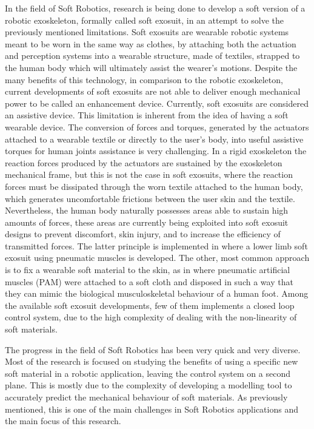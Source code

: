 In the field of Soft Robotics, research is being done to develop a soft version of a robotic exoskeleton, formally called soft exosuit, in an attempt to solve the previously mentioned limitations. Soft exosuits are wearable robotic systems meant to be worn in the same way as clothes, by attaching both the actuation and perception systems into a wearable structure, made of textiles, strapped to the human body which will ultimately assist the wearer's motions. Despite the many benefits of this technology, in comparison to the robotic exoskeleton, current developments of soft exosuits are not able to deliver enough mechanical power to be called an enhancement device. Currently, soft exosuits are considered an assistive device. This limitation is inherent from the idea of having a soft wearable device. The conversion of forces and torques, generated by the actuators attached to a wearable textile or directly to the user's body, into useful assistive torques for human joints assistance is very challenging. In a rigid exoskeleton the reaction forces produced by the actuators are sustained by the exoskeleton mechanical frame, but this is not the case in soft exosuits, where the reaction forces must be dissipated through the worn textile attached to the human body, which generates uncomfortable frictions between the user skin and the textile. Nevertheless, the human body naturally possesses areas able to sustain high amounts of forces, these areas are currently being exploited into soft exosuit designs to prevent discomfort, skin injury, and to increase the efficiency of transmitted forces. The latter principle is implemented in \cite{wehner2013lightweight} where a lower limb soft exosuit using pneumatic muscles is developed. The other, most common approach is to fix a wearable soft material to the skin, as in \cite{park2014design,park2011bio} where pneumatic artificial muscles (PAM) were attached to a soft cloth and disposed in such a way that they can mimic the biological musculoskeletal behaviour of a human foot. Among the available soft exosuit developments, few of them implements a closed loop control system, due to the high complexity of dealing with the non-linearity of soft materials. 

The progress in the field of Soft Robotics has been very quick and very diverse. Most of the research is focused on studying the benefits of using a specific new soft material in a robotic application, leaving the control system on a second plane. This is mostly due to the complexity of developing a modelling tool to accurately predict the mechanical behaviour of soft materials. As previously mentioned, this is one of the main challenges in Soft Robotics applications and the main focus of this research.

